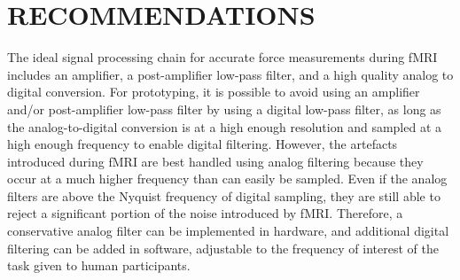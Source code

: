 \documentclass[letterpaper, 10 pt, conference]{ieeeconf}  %
\begin{document}
\section{RECOMMENDATIONS}

The ideal signal processing chain for accurate force measurements during fMRI includes an amplifier, a post-amplifier low-pass filter, and a high quality analog to digital conversion. For prototyping, it is possible to avoid using an amplifier and/or post-amplifier low-pass filter by using a digital low-pass filter, as long as the analog-to-digital conversion is at a high enough resolution and sampled at a high enough frequency to enable digital filtering. However, the artefacts introduced during fMRI are best handled using analog filtering because they occur at a much higher frequency than can easily be sampled. Even if the analog filters are above the Nyquist frequency of digital sampling, they are still able to reject a significant portion of the noise introduced by fMRI. Therefore, a conservative analog filter can be implemented in hardware, and additional digital filtering can be added in software, adjustable to the frequency of interest of the task given to human participants.


\addtolength{\textheight}{-12cm}   %



\end{document}
